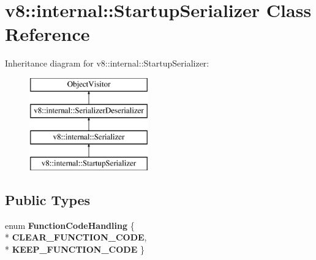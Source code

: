 \hypertarget{classv8_1_1internal_1_1_startup_serializer}{}\section{v8\+:\+:internal\+:\+:Startup\+Serializer Class Reference}
\label{classv8_1_1internal_1_1_startup_serializer}
Inheritance diagram for v8\+:\+:internal\+:\+:Startup\+Serializer\+:\begin{figure}[H]
\begin{center}
\leavevmode
\includegraphics[height=4.000000cm]{classv8_1_1internal_1_1_startup_serializer}
\end{center}
\end{figure}
\subsection*{Public Types}
\begin{DoxyCompactItemize}
\item 
enum {\bfseries Function\+Code\+Handling} \{ \\*
{\bfseries C\+L\+E\+A\+R\+\_\+\+F\+U\+N\+C\+T\+I\+O\+N\+\_\+\+C\+O\+DE}, 
\\*
{\bfseries K\+E\+E\+P\+\_\+\+F\+U\+N\+C\+T\+I\+O\+N\+\_\+\+C\+O\+DE}
 \}\hypertarget{classv8_1_1internal_1_1_startup_serializer_a20031258d9f96e293c5ab8d360dfb920}{}\label{classv8_1_1internal_1_1_startup_serializer_a20031258d9f96e293c5ab8d360dfb920}

\end{DoxyCompactItemize}
